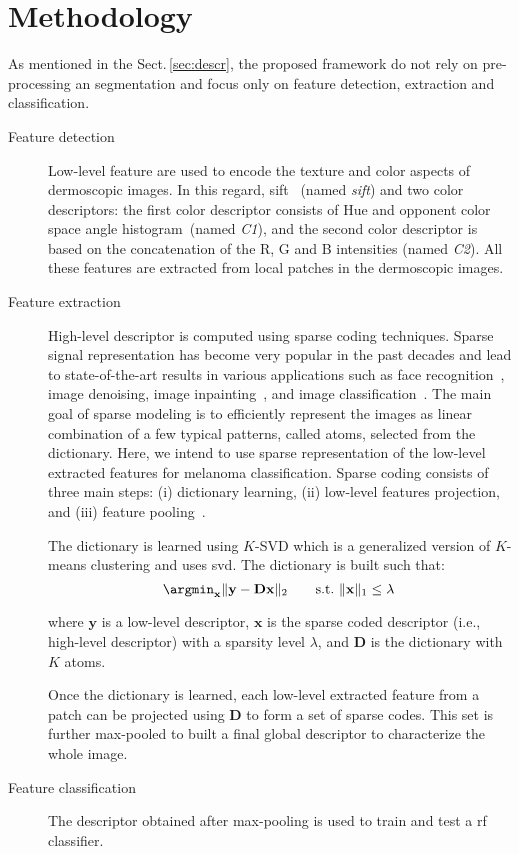 \section{Methodology}
\label{sec:method}
\graphicspath{ {./content/method/figures/} }
As mentioned in the Sect.\,\ref{sec:descr}, the proposed framework do not rely on pre-processing an segmentation and focus only on feature detection, extraction and classification.
\begin{description}
\item[Feature detection] Low-level feature are used to encode the texture and color aspects of dermoscopic images. In this regard, \ac{sift}~\cite{lowe1999object} (named \emph{\ac{sift}}) and two color descriptors: the first color descriptor consists of Hue and opponent color space angle histogram~\cite{van2006coloring}(named \emph{C1}), and the second color descriptor is based on the concatenation of the R, G and B intensities (named \emph{C2}). All these features are extracted from local patches in the dermoscopic images.
\item[Feature extraction] High-level descriptor is computed using sparse coding techniques. Sparse signal representation has become very popular in the past decades and lead to state-of-the-art results in various applications such as face recognition~\cite{wright2009robust}, image denoising, image inpainting~\cite{elad2006image}, and image classification~\cite{sidibe2015discrimination}. The main goal of sparse modeling is to efficiently represent the images as linear combination of a few typical patterns, called atoms, selected from the dictionary. Here, we intend to use sparse representation of the low-level extracted features for melanoma classification. Sparse coding consists of three main steps: (i) dictionary learning, (ii) low-level features projection, and (iii) feature pooling~\cite{rubinstein2008efficient}. 

The dictionary is learned using $K$-SVD which is a generalized version of $K$-means clustering and uses \ac{svd}. The dictionary is built such that:
\begin{equation}
  \argmin_{\mathbf{x}} \|\mathbf{y} - \mathbf{D}\mathbf{x}\|_{2} \qquad  \text{s.t.} \  \|\mathbf{x}\|_{1} \leq \lambda \,
\end{equation}

\noindent where $\mathbf{y}$ is a low-level descriptor, $\mathbf{x}$ is the sparse coded descriptor (i.e., high-level descriptor) with a sparsity level $\lambda$, and $\mathbf{D}$ is the dictionary with $K$ atoms.

Once the dictionary is learned, each low-level extracted feature from a patch can be projected using $\mathbf{D}$ to form a set of sparse codes. This set is further max-pooled to built a final global descriptor to characterize the whole image.
\item[Feature classification] The descriptor obtained after max-pooling is used to train and test a \ac{rf} classifier. 
\end{description}

